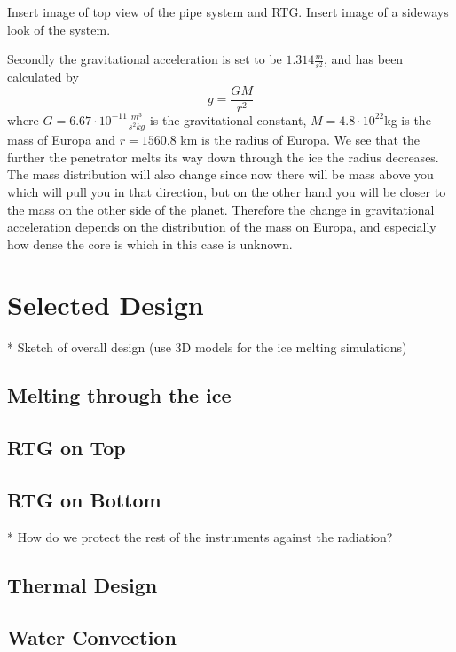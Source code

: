 Insert image of top view of the pipe system and RTG. 
Insert image of a sideways look of the system.


Secondly the gravitational acceleration is set to be $1.314 \frac{m}{s^2}$, and has been calculated by 
\begin{equation}
g = \frac{GM}{r^2}
\end{equation} 
where $G = 6.67\cdot 10^{-11}\frac{m^3}{s^2 kg}$ is the gravitational constant, $M = 4.8\cdot 10^{22}$kg is the mass of Europa and $r = 1560.8$ km is the radius of Europa.  We see that the further the penetrator melts its way down through the ice the radius decreases. The mass distribution will also change since now there will be mass above you which will pull you in that direction, but on the other hand you will be closer to the mass on the other side of the planet. Therefore the change in gravitational acceleration depends on the distribution of the mass on Europa, and especially how dense the core is which in this case is unknown. 



\section{Selected Design}

* Sketch of overall design (use 3D models for the ice melting simulations)

\subsection{Melting through the ice} %

\subsection{RTG on Top}

\subsection{RTG on Bottom}

* How do we protect the rest of the instruments against the radiation?


\subsection{Thermal Design}

\subsection{Water Convection}

